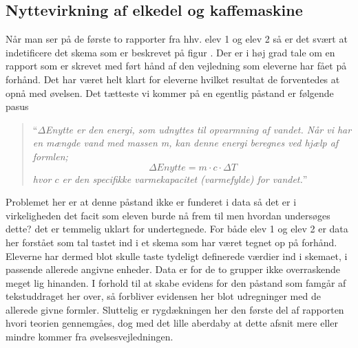  \subsection*{Nyttevirkning af elkedel og kaffemaskine}
Når man ser på de første to rapporter fra hhv. elev 1 og elev 2 så er det svært at indetificere det skema som er beskrevet på figur . Der er i høj grad tale om en rapport som er skrevet med ført hånd af den vejledning som eleverne har fået på forhånd. Det har været helt klart for eleverne hvilket resultat de forventedes at opnå med øvelsen. Det tætteste vi kommer på en egentlig påstand er følgende pasus
\begin{quote}
	``\emph{$\Delta$Enytte er den energi, som udnyttes til opvarmning af vandet. Når vi har en mængde vand med massen m, kan denne energi beregnes ved hjælp af formlen;
	\begin{equation*}
	\Delta Enytte = m\cdot c\cdot \Delta T
	\end{equation*}
	hvor $c$ er den specifikke varmekapacitet (varmefylde) for vandet.}''
\end{quote}
Problemet her er at denne påstand ikke er funderet i data så det er i virkeligheden det facit som eleven burde nå frem til men hvordan undersøges dette? det er temmelig uklart for undertegnede. For både elev 1 og elev 2 er data her forstået som tal tastet ind i et skema som har været tegnet op på forhånd. Eleverne har dermed blot skulle taste tydeligt definerede værdier ind i skemaet, i passende allerede angivne enheder. Data er for de to grupper ikke overraskende meget lig hinanden. I forhold til at skabe evidens for den påstand som famgår af tekstuddraget her over, så forbliver evidensen her blot udregninger med de allerede givne formler. Sluttelig er rygdækningen her den første del af rapporten hvori teorien gennemgåes, dog med det lille aberdaby at dette afsnit mere eller mindre kommer fra øvelsesvejledningen.
